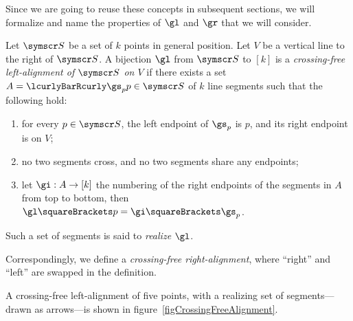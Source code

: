 \documentclass[10pt, a4paper, twoside]{basestyle}
\newcommand{\pointset}{\symscr}
\begin{document}
Since we are going to reuse these concepts in subsequent sections, we will formalize and name the properties of
$\gl$ and $\gr$ that we will consider.
\begin{definition}
Let ${\pointset S}$ be a set of $k$ points in general position. Let $V$ be a vertical line to the right of ${\pointset S}$.
A bijection $\gl$ from ${\pointset S}$ to $[k]$ is a \emph{crossing-free left-alignment of ${\pointset S}$ on $V$} if
there exists a set $A=\setst{\gs_p}{p\in{\pointset S}}$ of $k$ line segments such that
the following hold:
\begin{enumerate}
\item for every $p\in{\pointset S}$, the left endpoint of $\gs_p$ is $p$, and its right endpoint is on $V$;
\item no two segments cross, and no two segments share any endpoints;
\item let $\FunctionSpec \gi A {[k]}$ the numbering of the right endpoints of the segments in
$A$ from top to bottom, then $\gl\of p = \gi\of{\gs_p}$.
\end{enumerate}
Such a set of segments is said to \emph{realize} $\gl$.

Correspondingly, we define a \emph{crossing-free right-alignment}, where ``right'' and ``left'' are swapped in the
definition.
\end{definition}
A crossing-free left-alignment of five points, with a realizing set of segments---drawn as arrows---is shown in
figure~\ref{figCrossingFreeAlignment}.
\end{document}
